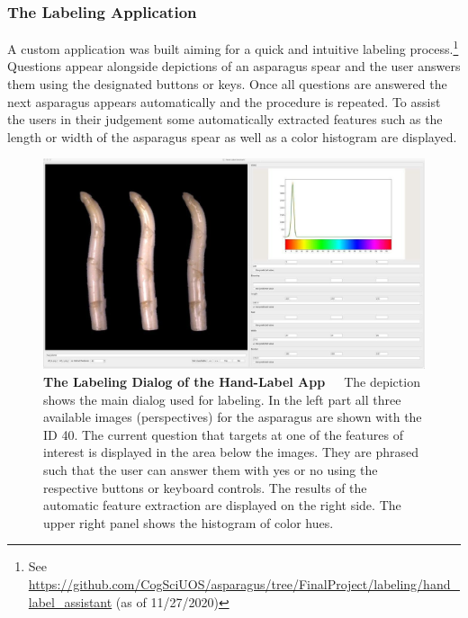 \subsubsection{The Labeling Application}
\label{subsec:LabelApp}

A custom application was built aiming for a quick and intuitive labeling process.\footnote{ See \url{https://github.com/CogSciUOS/asparagus/tree/FinalProject/labeling/hand\_label\_assistant} (as of 11/27/2020)} Questions appear alongside depictions of an asparagus spear and the user answers them using the designated buttons or keys. Once all questions are answered the next asparagus appears automatically and the procedure is repeated. To assist the users in their judgement some automatically extracted features such as the length or width of the asparagus spear as well as a color histogram are displayed.

\begin{figure}[!htb]
    \centering
    \includegraphics[scale=0.3]{Figures/chapter03/labelapp_example.png}
    \decoRule
    \caption[The Labeling Dialog of the Hand-Label App]{\textbf{The Labeling Dialog of the Hand-Label App}~~~The depiction shows the main dialog used for labeling. In the left part all three available images (perspectives) for the asparagus are shown with the ID 40. The current question that targets at one of the features of interest is displayed in the area below the images. They are phrased such that the user can answer them with yes or no using the respective buttons or keyboard controls. The results  of the automatic feature extraction are displayed on the right side. The upper right panel shows the histogram of color hues.}
    \label{fig:LabelAppGUI}
\end{figure}

